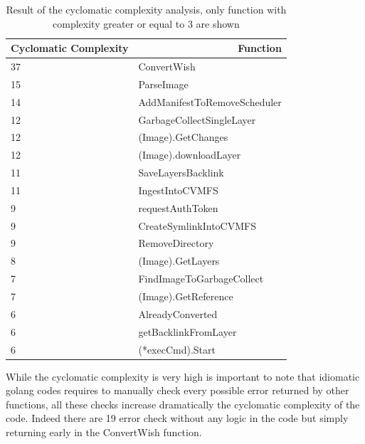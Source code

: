 \begin{table}[]
\begin{tabular}{|l|l|}
\hline
\multicolumn{1}{|r|}{Cyclomatic Complexity} & \multicolumn{1}{r|}{Function} \\ \hline
37 & ConvertWish \\ \hline
15 & ParseImage \\ \hline
14 & AddManifestToRemoveScheduler \\ \hline
12 & GarbageCollectSingleLayer \\ \hline
12 & (Image).GetChanges \\ \hline
12 & (Image).downloadLayer \\ \hline
11 & SaveLayersBacklink \\ \hline
11 & IngestIntoCVMFS \\ \hline
9 & requestAuthToken \\ \hline
9 & CreateSymlinkIntoCVMFS \\ \hline
9 & RemoveDirectory \\ \hline
8 & (Image).GetLayers \\ \hline
7 & FindImageToGarbageCollect \\ \hline
7 & (Image).GetReference \\ \hline
6 & AlreadyConverted \\ \hline
6 & getBacklinkFromLayer \\ \hline
6 & (*execCmd).Start \\ \hline
\end{tabular}
\caption{Result of the cyclomatic complexity analysis, only function with complexity greater or equal to 3 are shown}
\label{tbl:cyclomatic}
\end{table}

While the cyclomatic complexity is very high is important to note that
idiomatic golang codes requires to manually check every possible error returned
by other functions, all these checks increase dramatically the cyclomatic
complexity of the code. Indeed there are 19 error check without any logic in
the code but simply returning early in the ConvertWish function.


